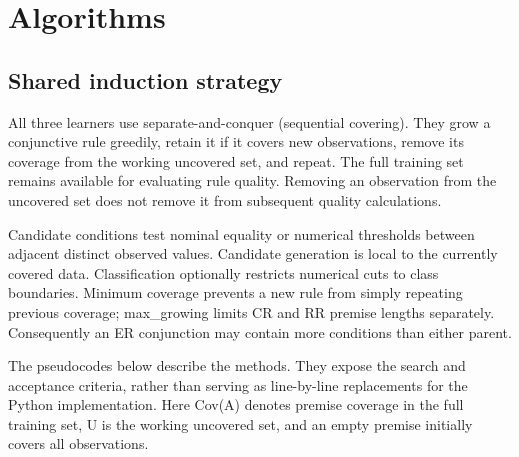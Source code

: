 \section{Algorithms}
\label{supplement-algorithms}

\subsection{Shared induction strategy}
\label{algorithms}

\label{shared-induction-strategy}
All three learners use separate-and-conquer (sequential covering). They grow a
conjunctive rule greedily, retain it if it covers new observations, remove its
coverage from the working uncovered set, and repeat. The full training set
remains available for evaluating rule quality. Removing an observation from the
uncovered set does not remove it from subsequent quality calculations.

Candidate conditions test nominal equality or numerical thresholds between
adjacent distinct observed values. Candidate generation is local to the
currently covered data. Classification optionally restricts numerical cuts to
class boundaries. Minimum coverage prevents a new rule from simply repeating
previous coverage; {\ttfamily\small max\_growing} limits CR and RR premise lengths separately.
Consequently an ER conjunction may contain more conditions than either parent.

The pseudocodes below describe the methods. They expose the search and acceptance
criteria, rather than serving as line-by-line replacements for the Python
implementation. 
Here {\ttfamily\small Cov(A)} denotes premise coverage in the full training set, {\ttfamily\small U} is the
working uncovered set, and an empty premise initially covers all observations.

